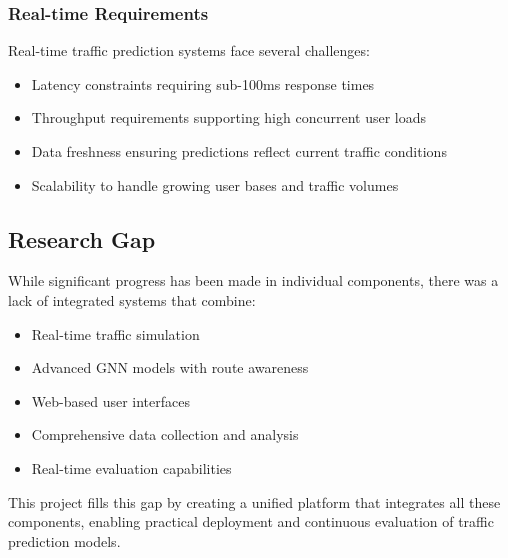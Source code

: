 \subsubsection{Real-time Requirements}
Real-time traffic prediction systems face several challenges:
\begin{itemize}
    \item Latency constraints requiring sub-100ms response times
    \item Throughput requirements supporting high concurrent user loads
    \item Data freshness ensuring predictions reflect current traffic conditions
    \item Scalability to handle growing user bases and traffic volumes
\end{itemize}

\subsection{Research Gap}

While significant progress has been made in individual components, there was a lack of integrated systems that combine:
\begin{itemize}
    \item Real-time traffic simulation
    \item Advanced GNN models with route awareness
    \item Web-based user interfaces
    \item Comprehensive data collection and analysis
    \item Real-time evaluation capabilities
\end{itemize}

This project fills this gap by creating a unified platform that integrates all these components, enabling practical deployment and continuous evaluation of traffic prediction models.

